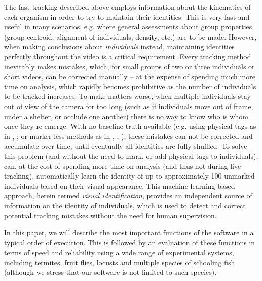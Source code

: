 \documentclass[9pt,lineno]{elife}
\newcommand{\TRex}{\protect\path{TRex}}
\begin{document}
The fast tracking described above employs information about the kinematics of each organism in order to try to maintain their identities. This is very fast and useful in many scenarios, e.g. where general assessments about group properties (group centroid, alignment of individuals, density, etc.) are to be made. However, when making conclusions about \textit{individuals} instead, maintaining identities perfectly throughout the video is a critical requirement. Every tracking method inevitably makes mistakes, which, for small groups of two or three individuals or short videos, can be corrected manually -- at the expense of spending much more time on analysis, which rapidly becomes prohibitive as the number of individuals to be tracked increases. To make matters worse, when multiple individuals stay out of view of the camera for too long (such as if individuals move out of frame, under a shelter, or occlude one another) there is no way to know who is whom once they re-emerge. With no baseline truth available (e.g. using physical tags as in \cite{alarcon2018automated}, \cite{nagy2013context}; or marker-less methods as in \cite{idtracker}, \cite{idtrackerai}, \cite{rasch2016closing}), these mistakes can not be corrected and accumulate over time, until eventually all identities are fully shuffled. To solve this problem (and without the need to mark, or add physical tags to individuals), \TRex{} can, at the cost of spending more time on analysis (and thus not during live-tracking), automatically learn the identity of up to approximately 100 unmarked individuals based on their visual appearance. This machine-learning based approach, herein termed \textit{visual identification}, provides an independent source of information on the identity of individuals, which is used to detect and correct potential tracking mistakes without the need for human supervision.

In this paper, we will describe the most important functions of the software in a typical order of execution. This is followed by an evaluation of these functions in terms of speed and reliability using a wide range of experimental systems, including termites, fruit flies, locusts and multiple species of schooling fish (although we stress that our software is not limited to such species).
\end{document}
